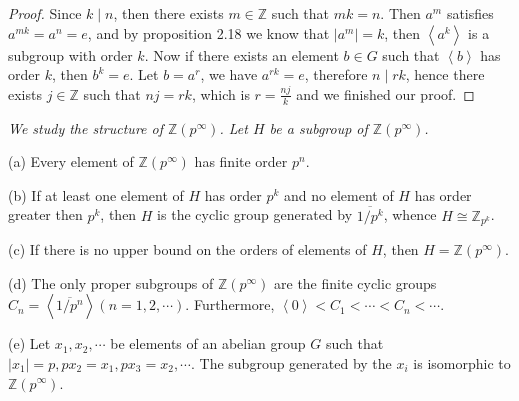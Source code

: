 \begin{proof}
Since $k\mid n$, then there exists $m\in\mathbb{Z}$ such that $mk=n$. Then $a^m$ satisfies $a^{mk}=a^n=e$, and by proposition 2.18 we know that $|a^m|=k$, then $\left<a^k\right>$ is a subgroup with order $k$. Now if there exists an element $b\in G$ such that $\left<b\right>$ has order $k$, then $b^k=e$. Let $b=a^r$, we have $a^{rk}=e$, therefore $n\mid rk$, hence there exists $j\in\mathbb{Z}$ such that $nj=rk$, which is $r=\frac{nj}{k}$ and we finished our proof.
\end{proof}
\begin{problem}\em
We study the structure of $\mathbb{Z}(p^\infty)$. Let $H$ be a subgroup of $\mathbb{Z}(p^\infty)$.\par
(a) Every element of $\mathbb{Z}(p^\infty)$ has finite order $p^n$.\par
(b) If at least one element of $H$ has order $p^k$ and no element of $H$ has order greater then $p^k$, then $H$ is the cyclic group generated by $\overline{1/p^k}$, whence $H\cong\mathbb{Z}_{p^k}$.\par
(c) If there is no upper bound on the orders of elements of $H$, then $H=\mathbb{Z}(p^\infty)$.\par
(d) The only proper subgroups of $\mathbb{Z}(p^\infty)$ are the finite cyclic groups $C_n=\left<\overline{1/p^n}\right>(n=1,2,\cdots)$. Furthermore, $\left<0\right><C_1<\cdots<C_n<\cdots$.\par
(e) Let $x_1,x_2,\cdots$ be elements of an abelian group $G$ such that $|x_1|=p,px_2=x_1,px_3=x_2,\cdots$. The subgroup generated by the $x_i$ is isomorphic to $\mathbb{Z}(p^\infty)$.
\end{problem}
